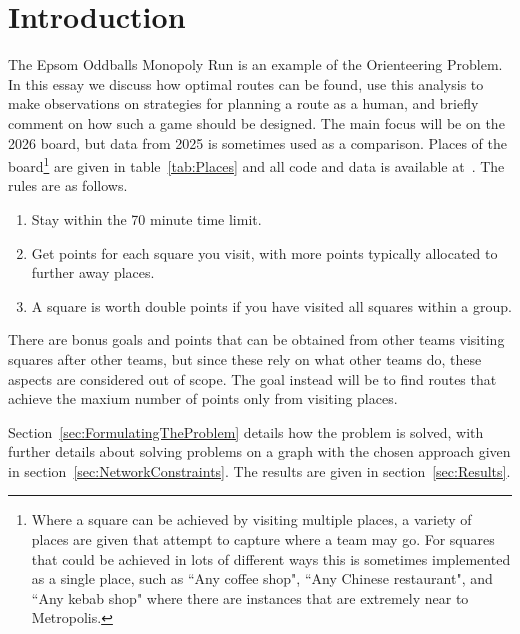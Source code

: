 \section{Introduction}
\label{sec:Introduction}

The Epsom Oddballs Monopoly Run is an example of the Orienteering Problem. In this essay we discuss how optimal routes can be found, use this analysis to make observations on strategies for planning a route as a human, and briefly comment on how such a game should be designed. The main focus will be on the 2026 board, but data from 2025 is sometimes used as a comparison. Places of the board\footnote{Where a square can be achieved by visiting multiple places, a variety of places are given that attempt to capture where a team may go. For squares that could be achieved in lots of different ways this is sometimes implemented as a single place, such as ``Any coffee shop", ``Any Chinese restaurant", and ``Any kebab shop" where there are instances that are extremely near to Metropolis.} are given in table~\ref{tab:Places} and all code and data is available at~\cite{GithubRepository}. The rules are as follows.

\begin{enumerate}
	\item Stay within the 70 minute time limit.
	\item Get points for each square you visit, with more points typically allocated to further away places.
	\item A square is worth double points if you have visited all squares within a group.
\end{enumerate}

There are bonus goals and points that can be obtained from other teams visiting squares after other teams, but since these rely on what other teams do, these aspects are considered out of scope. The goal instead will be to find routes that achieve the maxium number of points only from visiting places.

Section~\ref{sec:FormulatingTheProblem} details how the problem is solved, with further details about solving problems on a graph with the chosen approach given in section~\ref{sec:NetworkConstraints}. The results are given in section~\ref{sec:Results}.

